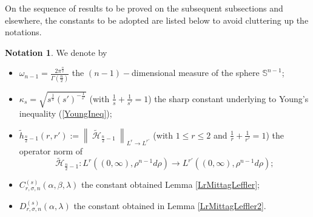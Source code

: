 \documentclass{amsart}
\theoremstyle{definition}
\newtheorem{notation}[theorem]{Notation}
\theoremstyle{remark}
\numberwithin{equation}{section}
\begin{document}
On the sequence of results to be proved on the subsequent subsections and elsewhere, the constants to be adopted are listed below to avoid cluttering up the notations.
\begin{notation}\label{SharpConstants}
	We denote by
	\begin{itemize}
		\item[\bf (a)] $\displaystyle \omega_{n-1}=\frac{2\pi^{\frac{n}{2}}}{\Gamma\left(\frac{n}{2}\right)}$ the $(n-1)-$dimensional measure of the sphere $\mathbb{S}^{n-1}$; 
		\item[\bf (b)] $\displaystyle \kappa_s=\sqrt{{s^{\frac{1}{s}}}{(s')^{-\frac{1}{s'}}}}$ (with $\displaystyle \frac{1}{s}+\frac{1}{s'}=1$) the sharp constant underlying to Young's inequality (\ref{YoungIneq});
		\item[\bf (c)] $\displaystyle \widetilde{h}_{\frac{n}{2}-1}(r,r'):=\left\|~\widetilde{\mathcal{H}}_{\frac{n}{2}-1}~\right\|_{L^r\rightarrow L^{r'}}$ (with $1\leq r\leq 2$ and $\displaystyle \frac{1}{r}+\frac{1}{r'}=1$) the operator norm of $$\widetilde{\mathcal{H}}_{\frac{n}{2}-1}:L^r((0,\infty),\rho^{n-1}d\rho)\rightarrow L^{r'}((0,\infty),\rho^{n-1}d\rho);$$
		\item[\bf (d)] 
		$C_{r,\sigma,n}^{(s)}(\alpha,\beta,\lambda)$ the constant obtained Lemma \ref{LrMittagLeffler};
		\item[\bf (e)] 
		$D_{r,\sigma,n}^{(s)}(\alpha,\lambda)$ the constant obtained in Lemma \ref{LrMittagLeffler2}.
	\end{itemize}
\end{notation}
\end{document}
